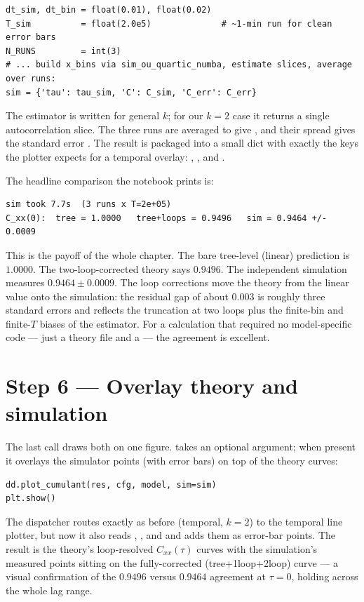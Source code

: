 \begin{lstlisting}
dt_sim, dt_bin = float(0.01), float(0.02)
T_sim          = float(2.0e5)              # ~1-min run for clean error bars
N_RUNS         = int(3)
# ... build x_bins via sim_ou_quartic_numba, estimate slices, average over runs:
sim = {'tau': tau_sim, 'C': C_sim, 'C_err': C_err}
\end{lstlisting}

The estimator  is written for general $k$; for our
$k=2$ case it returns a single autocorrelation slice. The three runs are averaged
to give , and their spread gives the standard error .
The result is packaged into a small  dict with exactly the keys the
plotter expects for a temporal overlay: , , and
.

The headline comparison the notebook prints is:

\begin{lstlisting}[style=console]
sim took 7.7s  (3 runs x T=2e+05)
C_xx(0):  tree = 1.0000   tree+loops = 0.9496   sim = 0.9464 +/- 0.0009
\end{lstlisting}

This is the payoff of the whole chapter. The bare tree-level (linear) prediction
is $1.0000$. The two-loop-corrected theory says $0.9496$. The independent
simulation measures $0.9464 \pm 0.0009$. The loop corrections move the theory
from the linear value onto the simulation: the residual gap of about $0.003$ is
roughly three standard errors and reflects the truncation at two loops plus the
finite-bin and finite-$T$ biases of the estimator. For a calculation that
required no model-specific code --- just a theory file and a  --- the
agreement is excellent.

\section{Step 6 --- Overlay theory and simulation}

The last call draws both on one figure.  takes an optional
 argument; when present it overlays the simulator points (with error
bars) on top of the theory curves:

\begin{lstlisting}
dd.plot_cumulant(res, cfg, model, sim=sim)
plt.show()
\end{lstlisting}

The dispatcher routes exactly as before (temporal, $k=2$) to the temporal line
plotter, but now it also reads , , and
 and adds them as error-bar points. The result is the
theory's loop-resolved $C_{xx}(\tau)$ curves with the simulation's measured
points sitting on the fully-corrected (tree+1loop+2loop) curve --- a visual
confirmation of the $0.9496$ versus $0.9464$ agreement at $\tau = 0$, holding
across the whole lag range.


